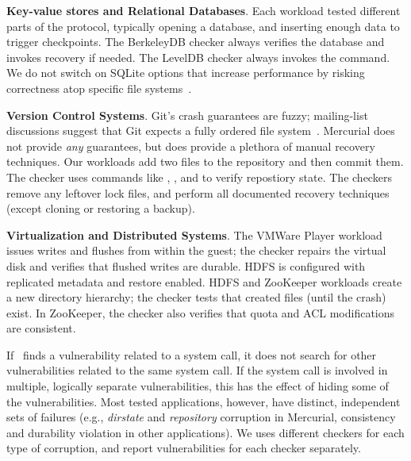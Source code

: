 \textbf{Key-value stores and Relational Databases}. Each workload tested
different parts of the protocol, typically opening a database, and inserting
enough data to trigger checkpoints. The BerkeleyDB checker 
always verifies the database and invokes recovery if needed. The
LevelDB checker always invokes the  command. We do not
switch on SQLite options that increase performance by risking correctness atop
specific file systems~\cite{ThanuEtAl13-appconsistency-hotdep}.


\textbf{Version Control Systems}. Git's crash guarantees are fuzzy;
mailing-list discussions suggest that Git expects a fully ordered file
system~\cite{git-linus}. Mercurial does not provide \textit{any} guarantees,
but does provide a plethora of manual recovery techniques. Our workloads
add two files to the repository and then commit them. The checker
uses commands like , , and
 to verify repostiory state. The checkers remove any
leftover lock files, and perform all documented recovery techniques (except
cloning or restoring a backup).


\textbf{Virtualization and Distributed Systems}. The VMWare Player workload
issues writes and flushes from within the guest; the checker repairs the
virtual disk and verifies that flushed writes are durable. HDFS is configured
with replicated metadata and restore enabled. HDFS and ZooKeeper workloads
create a new directory hierarchy; the checker tests that created files (until
the crash) exist.  In ZooKeeper, the checker also verifies that quota and ACL
modifications are consistent.

If \toolname\ finds a vulnerability related to a system call, it does not
search for other vulnerabilities related to the same system call. If the system
call is involved in multiple, logically separate vulnerabilities, this has the
effect of hiding some of the vulnerabilities. Most tested applications,
however, have distinct, independent sets of failures (e.g., \textit{dirstate}
and \textit{repository} corruption in Mercurial, consistency and durability
violation in other applications). We uses different checkers for each type of
corruption, and report vulnerabilities for each checker separately. 

